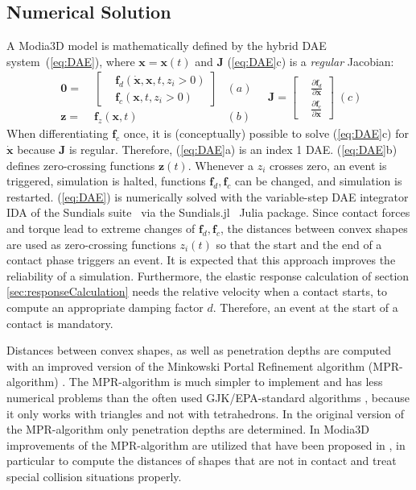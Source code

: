 \subsection{Numerical Solution}\label{sec:numericSolution}

\newcommand{\bvec}[1]{\bm{#1}}

A Modia3D model is mathematically defined by the hybrid DAE system~(\ref{eq:DAE}), 
where $\bvec{x} = \bvec{x}(t)$ 
and $\bvec{J}$ (\ref{eq:DAE}c) is a \emph{regular} Jacobian:
%
\begin{equation} \label{eq:DAE}
\begin{aligned}
\bvec{0} = & \; \left[\begin{aligned}
& \bvec{f}_d(\dot{\bvec{x}},\bvec{x},t, z_i > 0) \\
& \bvec{f}_c(\bvec{x},t, z_i > 0)
\end{aligned}\right]  & (a) \\
\bvec{z} = & \; \bvec{f}_z(\bvec{x},t) & (b)
\end{aligned} \quad
\bvec{J} = \left[\begin{aligned}
& \frac{\partial\bvec{f}_d}{\partial\dot{\bvec{x}}} \\
& \frac{\partial\bvec{f}_c}{\partial{\bvec{x}}}
\end{aligned}\right] \; (c)
\end{equation}
%
When differentiating $\bvec{f}_c$ once, it is (conceptually) possible to
solve (\ref{eq:DAE}c) for $\dot{\bvec{x}}$ because $\bvec{J}$ is regular.
Therefore, (\ref{eq:DAE}a) is an index 1 DAE. (\ref{eq:DAE}b) defines zero-crossing functions $\bvec{z}(t)$. 
Whenever a $z_i$ crosses zero, an event is triggered, simulation is halted, functions
$\bvec{f}_d, \bvec{f}_c$ can be changed, and simulation is restarted. 
(\ref{eq:DAE}) is numerically solved with the variable-step
DAE integrator IDA of the Sundials suite~\cite{Sundials2005} via the
Sundials.jl~\cite{Rackauckas2017} Julia package. Since contact forces and torque
lead to extreme changes of $\bvec{f}_d, \bvec{f}_c$, 
the distances between convex shapes are used as zero-crossing functions $z_i(t)$ so
that the start and the end of a contact phase triggers an event. It is expected that this
approach improves the reliability of a simulation. Furthermore, the elastic response
calculation of section \ref{sec:responseCalculation} needs the relative velocity 
when a contact starts, to compute an appropriate 
damping factor $d$. Therefore, an event at the start of a contact is mandatory.

Distances between convex shapes, as well as penetration depths are computed with an improved version of the
Minkowski Portal Refinement algorithm (MPR-algorithm) \cite{snethen2008}.
The MPR-algorithm is much simpler to implement and has less numerical problems than the often used GJK/EPA-standard algorithms \cite{bergen2003, GJK1988}, because it only works with triangles and not with tetrahedrons.
In the original version of the MPR-algorithm \cite{snethen2008} only penetration depths are determined. In Modia3D improvements of the MPR-algorithm are utilized that have been proposed in \cite{kenwright2015,Neumayr2017}, in particular to compute the distances of shapes that are not in contact
and treat special collision situations properly.


